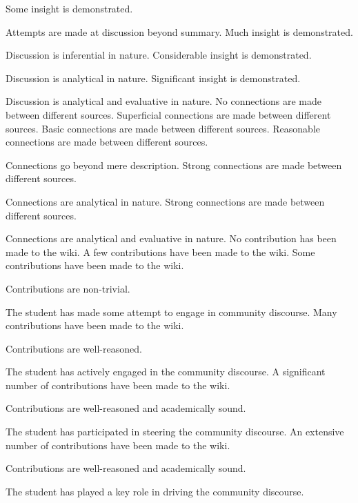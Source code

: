 \documentclass{../../fal_assignment}
\begin{document}
\begin{markingrubric}
        \grade		Some insight is demonstrated.
        \par		Attempts are made at discussion beyond summary.
        \grade		Much insight is demonstrated.
        \par		Discussion is inferential in nature.
        \grade		Considerable insight is demonstrated.
        \par		Discussion is analytical in nature.
        \grade		Significant insight is demonstrated.
        \par		Discussion is analytical and evaluative in nature.
%
        \grade\fail No connections are made between different sources.
        \grade		Superficial connections are made between different sources.
        \grade		Basic connections are made between different sources.
        \grade		Reasonable connections are made between different sources.
        \par		Connections go beyond mere description.
        \grade		Strong connections are made between different sources.
        \par		Connections are analytical in nature.
        \grade		Strong connections are made between different sources.
        \par		Connections are analytical and evaluative in nature.
%
        \grade\fail 	No contribution has been made to the wiki.
        \grade 		A few contributions have been made to the wiki.
        \grade 		Some contributions have been made to the wiki.
        \par		Contributions are non-trivial.
        \par		The student has made some attempt to engage in community discourse.
        \grade 		Many contributions have been made to the wiki.
        \par		Contributions are well-reasoned.
        \par		The student has actively engaged in the community discourse.
        \grade 		A significant number of contributions have been made to the wiki.
        \par		Contributions are well-reasoned and academically sound.
        \par		The student has participated in steering the community discourse.
        \grade 		An extensive number of contributions have been made to the wiki.
        \par		Contributions are well-reasoned and academically sound.
        \par		The student has played a key role in driving the community discourse.

\end{markingrubric}
\end{document}
